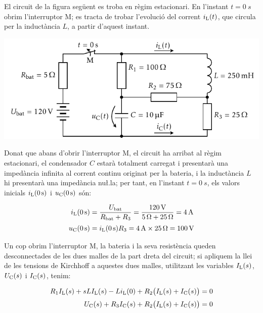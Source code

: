 \begin{exemple}
    El circuit de la figura seg\"{u}ent es troba en r\`{e}gim estacionari. En
    l'instant $t=\SI{0}{s}$ obrim l'interruptor M; es tracta de trobar
    l'evoluci\'{o} del corrent $i_\mathrm{L}(t)$, que circula per la induct\`{a}ncia
    $L$, a partir d'aquest instant.

    \begin{center}
        \includegraphics{Imatges/Cap-Laplace-Exemple3-Circuit.pdf}
    \end{center}

     Donat que abans d'obrir l'interruptor M, el circuit ha arribat al
     r\`{e}gim estacionari, el condensador $C$ estar\`{a} totalment carregat  i
     presentar\`{a} una imped\`{a}ncia infinita al corrent continu originat per la
     bateria, i la induct\`{a}ncia $L$ hi presentar\`{a} una imped\`{a}ncia nu{\l.l}a;
     per tant, en l'instant $t=\SI{0}{s}$, els valors inicials $i_\mathrm{L}(\SI{0}{s})$ i
     $u_\mathrm{C}(\SI{0}{s})$ s\'{o}n:

     \begin{align*}
        i_\mathrm{L}(\SI{0}{s}) &= \frac{U_\mathrm{bat}}{R_\mathrm{bat} + R_3} = \frac{\SI{120}{V}}
        {\SI{5}{\ensuremath{\mathrm{\Omega}}} + \SI{25}{\ensuremath{\mathrm{\Omega}}}} = \SI{4}{A} \\[0.5ex]
        u_\mathrm{C}(\SI{0}{s}) &= i_\mathrm{L}(\SI{0}{s}) R_3 = \SI{4}{A}\times \SI{25}{\ensuremath{\mathrm{\Omega}}} = \SI{100}{V}
     \end{align*}

    Un cop obrim l'interruptor M, la bateria i la seva resist\`{e}ncia
    queden desconnectades de les dues malles de la part dreta del circuit; si apliquem la llei de les tensions de Kirchhoff  a aquestes
    dues malles, utilitzant les variables $I_\mathrm{L}(s)$, $U_\mathrm{C}(s)$ i
    $I_\mathrm{C}(s)$, tenim:

    \begin{align*}
        R_1 I_\mathrm{L}(s) + s L I_\mathrm{L}(s) - L i_\mathrm{L}(0) + R_2
        \bigl(I_\mathrm{L}(s) + I_\mathrm{C}(s)\bigr) &=0 \\[0.5ex]
        U_\mathrm{C}(s) + R_3 I_\mathrm{C}(s) + R_2 \bigl(I_\mathrm{L}(s) + I_\mathrm{C}(s)\bigr) &=0
    \end{align*}


\end{exemple}
